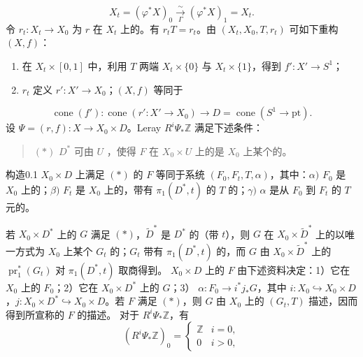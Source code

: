 \[
X_t=(\varphi^*X)_0\xrightarrow[\Gamma]{\sim}(\varphi^*X)_1=X_t.
\]
令 $r_t:X_t\to X_0$ 为 $r$ 在 $X_t$ 上的。有 $r_tT=r_t$。由 $(X_t,X_0,T,r_t)$ 可如下重构 $(X,f)$：
\begin{enumerate}
\item[($\alpha$)] 在 $X_t\times[0,1]$ 中，利用 $T$ 两端 $X_t\times\{0\}$ 与 $X_t\times\{1\}$，得到 $f':X'\to S^1$；
\item[($\beta$)] $r_t$ 定义 $r':X'\to X_0$；$(X,f)$ 等同于
\end{enumerate}
\[
\operatorname{cone}(f'):\operatorname{cone}(r':X'\to X_0)\longrightarrow D=\operatorname{cone}(S^1\to\mathrm{pt}).
\]
设 $\Psi=(r,f):X\to X_0\times D$。Leray  $R^i\Psi_*\mathbb Z$ 满足下述条件：
\begin{quote}
$(*)$ $D^*$ 可由 $U$ ，使得 $F$ 在 $X_0\times U$ 上的是 $X_0$ 上某个的。
\end{quote}
\begin{SGAresult}{构造}{0.1}
$X_0\times D$ 上满足 $(*)$ 的 $F$ 等同于系统 $(F_0,F_t,T,\alpha)$，其中：$\alpha)$ $F_0$ 是 $X_0$ 上的；$\beta)$ $F_t$ 是 $X_0$ 上的，带有 $\pi_1(D^*,t)$ 的 $T$ 的；$\gamma)$ $\alpha$ 是从 $F_0$ 到 $F_t$ 的 $T$ 元的。
\end{SGAresult}
若 $X_0\times D^*$ 上的 $G$ 满足 $(*)$，$\widetilde D^*$ 是 $D^*$ 的（带 $t$），则 $G$ 在 $X_0\times\widetilde D^*$ 上的以唯一方式为 $X_0$ 上某个 $G_t$ 的；$G_t$ 带有 $\pi_1(D^*,t)$ 的，而 $G$ 由 $X_0\times\widetilde D^*$ 上的 $\operatorname{pr}_1^*(G_t)$ 对 $\pi_1(D^*,t)$ 取商得到。
$X_0\times D$ 上的 $F$ 由下述资料决定：1）它在 $X_0$ 上的 $F_0$；2）它在 $X_0\times D^*$ 上的 $G$；3） $\alpha:F_0\to i^*j_*G$，其中 $i:X_0\hookrightarrow X_0\times D$，$j:X_0\times D^*\hookrightarrow X_0\times D$。若 $F$ 满足 $(*)$，则 $G$ 由 $X_0$ 上的 $(G_t,T)$ 描述，因而得到所宣称的 $F$ 的描述。
对于 $R^i\Psi_*\mathbb Z$，有
\[
(R^i\Psi_*\mathbb Z)_0=\begin{cases}\mathbb Z&i=0,\\0&i>0,\end{cases}
\]
